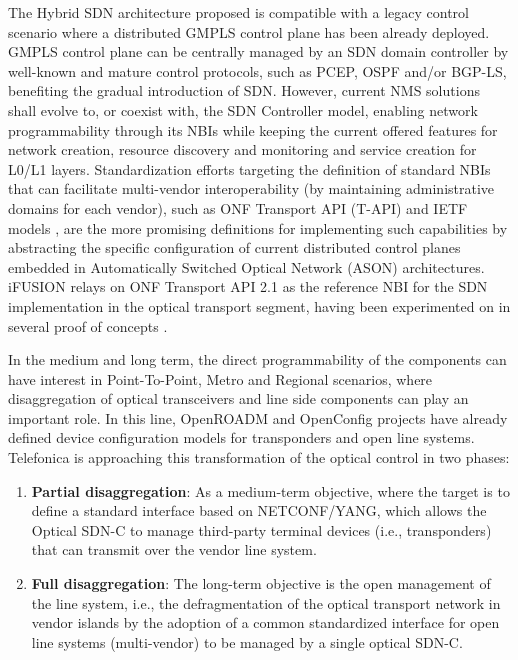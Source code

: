 \documentclass[a4paper,fleqn]{cas-dc}
\begin{document}
The Hybrid SDN architecture proposed is compatible with a legacy control scenario where a distributed GMPLS control plane has been already deployed. GMPLS control plane can be centrally managed by an SDN domain controller by well-known and mature control protocols, such as PCEP, OSPF and/or BGP-LS, benefiting the gradual introduction of SDN. However, current NMS solutions shall evolve to, or coexist with, the SDN Controller model, enabling network programmability through its NBIs while keeping the current offered features for network creation, resource discovery and monitoring and service creation for L0/L1 layers. Standardization efforts targeting the definition of standard NBIs that can facilitate multi-vendor interoperability (by maintaining administrative domains for each vendor), such as ONF Transport API (T-API) \cite{lopez2016transport} and IETF models \cite{wu2017service}, are the more promising definitions for implementing such capabilities by abstracting the specific configuration of current distributed control planes embedded in Automatically Switched Optical Network (ASON) architectures. 
iFUSION relays on ONF Transport API 2.1 as the reference NBI for the SDN implementation in the optical transport segment, having been experimented on in several proof of concepts \cite{mayoral2016first,mayoral2017control,bravalheri2019vnf}. 

In the medium and long term, the direct programmability of the components can have interest in Point-To-Point, Metro and Regional scenarios, where disaggregation of optical transceivers and line side components can play an important role. In this line, OpenROADM \cite{oda2016learning,kundrat2019opening} and OpenConfig \cite{Openconfig,shaikhopenconfig} projects have already defined device configuration models for transponders and open line systems. Telefonica is approaching this transformation of the optical control in two phases:

\begin{enumerate}
    \item \textbf{Partial disaggregation}: As a medium-term objective, where the target is to define a standard interface based on NETCONF/YANG, which allows the Optical SDN-C to manage third-party terminal devices (i.e., transponders) that can transmit over the vendor line system.
    
    \item \textbf{Full disaggregation}: The long-term objective is the open management of the line system, i.e., the defragmentation of the optical transport network in vendor islands by the adoption of a common standardized interface for open line systems (multi-vendor) to be managed by a single optical SDN-C.
\end{enumerate}
\end{document}
